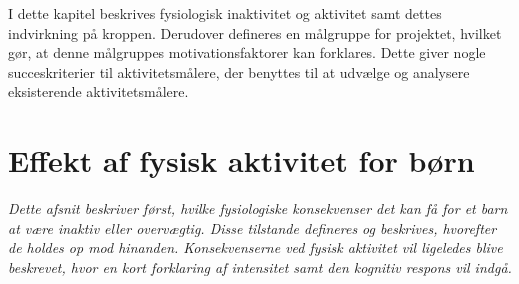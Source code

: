 I dette kapitel beskrives fysiologisk inaktivitet og aktivitet samt dettes indvirkning på kroppen. Derudover defineres en målgruppe for projektet, hvilket gør, at denne målgruppes motivationsfaktorer kan forklares. Dette giver nogle succeskriterier til aktivitetsmålere, der benyttes til at udvælge og analysere eksisterende aktivitetsmålere.

\section{Effekt af fysisk aktivitet for børn}\label{sec:fysio}
\textit{Dette afsnit beskriver først, hvilke fysiologiske konsekvenser det kan få for et barn at være inaktiv eller overvægtig. Disse tilstande defineres og beskrives, hvorefter de holdes op mod hinanden. Konsekvenserne ved fysisk aktivitet vil ligeledes blive beskrevet, hvor en kort forklaring af intensitet samt den kognitiv respons vil indgå.}

